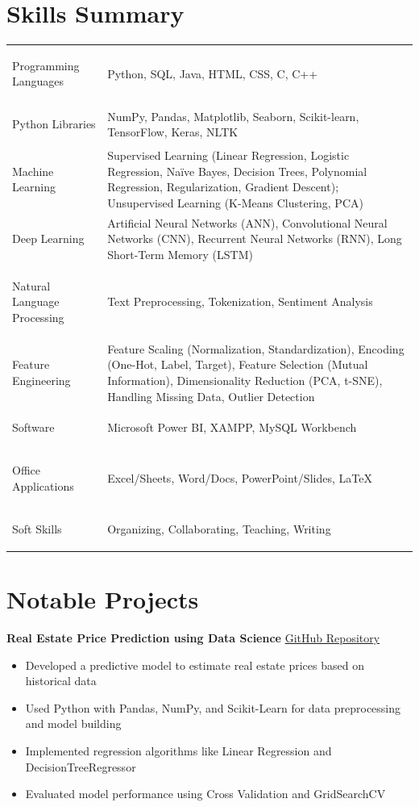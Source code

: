 \documentclass[11.5pt,a4paper]{article}
\newcommand{\projectitem}[2]{%
  \noindent\textbf{#1} \hfill \textcolor{subtext}{\href{#2}{GitHub Repository}}\par
}
\begin{document}
\section*{Skills Summary}
\renewcommand{\arraystretch}{1.6}
\noindent\begin{tabularx}{\textwidth}{@{\hspace{4pt}}>{\bfseries\raggedright\arraybackslash}p{3.6cm} @{\hspace{6pt}}X@{\hspace{4pt}}}
Programming Languages & Python, SQL, Java, HTML, CSS, C, C++ \\
Python Libraries & NumPy, Pandas, Matplotlib, Seaborn, Scikit-learn, TensorFlow, Keras, NLTK \\
Machine Learning & Supervised Learning (Linear Regression, Logistic Regression, Na\"ive Bayes, Decision Trees, Polynomial Regression, Regularization, Gradient Descent); Unsupervised Learning (K-Means Clustering, PCA) \\
Deep Learning & Artificial Neural Networks (ANN), Convolutional Neural Networks (CNN), Recurrent Neural Networks (RNN), Long Short-Term Memory (LSTM) \\
Natural Language Processing & Text Preprocessing, Tokenization, Sentiment Analysis \\
Feature Engineering & Feature Scaling (Normalization, Standardization), Encoding (One-Hot, Label, Target), Feature Selection (Mutual Information), Dimensionality Reduction (PCA, t-SNE), Handling Missing Data, Outlier Detection \\
Software & Microsoft Power BI, XAMPP, MySQL Workbench \\
Office Applications & Excel/Sheets, Word/Docs, PowerPoint/Slides, LaTeX \\
Soft Skills & Organizing, Collaborating, Teaching, Writing \\
\end{tabularx}
\vspace{4pt}

\section*{Notable Projects}

\projectitem{Real Estate Price Prediction using Data Science}{https://github.com/ShahidulHaqueShaheeen/Real_Estate_Price_Prediction.git}
\begin{itemize}
    \item Developed a predictive model to estimate real estate prices based on historical data
    \item Used Python with Pandas, NumPy, and Scikit-Learn for data preprocessing and model building
    \item Implemented regression algorithms like Linear Regression and DecisionTreeRegressor
    \item Evaluated model performance using Cross Validation and GridSearchCV
\end{itemize}
\end{document}
